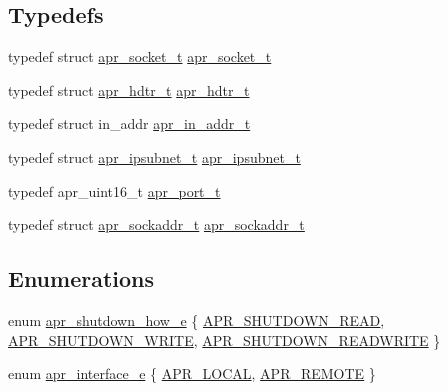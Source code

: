 \subsection*{Typedefs}
\begin{DoxyCompactItemize}
\item 
typedef struct \hyperlink{group__apr__network__io_ga49262b223e7434746e1f1737659aa2c3}{apr\+\_\+socket\+\_\+t} \hyperlink{group__apr__network__io_ga49262b223e7434746e1f1737659aa2c3}{apr\+\_\+socket\+\_\+t}
\item 
typedef struct \hyperlink{structapr__hdtr__t}{apr\+\_\+hdtr\+\_\+t} \hyperlink{group__apr__network__io_ga97887d5358a9c79c241ccafab61d8ff5}{apr\+\_\+hdtr\+\_\+t}
\item 
typedef struct in\+\_\+addr \hyperlink{group__apr__network__io_gad30d6c55a354a9a2e0a8747abb0c8176}{apr\+\_\+in\+\_\+addr\+\_\+t}
\item 
typedef struct \hyperlink{group__apr__network__io_gac86ee04eb80f938902095d1d0a67c324}{apr\+\_\+ipsubnet\+\_\+t} \hyperlink{group__apr__network__io_gac86ee04eb80f938902095d1d0a67c324}{apr\+\_\+ipsubnet\+\_\+t}
\item 
typedef apr\+\_\+uint16\+\_\+t \hyperlink{group__apr__network__io_gaa670a71960f6eb4fe0d0de2a1e7aba03}{apr\+\_\+port\+\_\+t}
\item 
typedef struct \hyperlink{structapr__sockaddr__t}{apr\+\_\+sockaddr\+\_\+t} \hyperlink{group__apr__network__io_ga373fb6f32d0875c5deb648b779c8a709}{apr\+\_\+sockaddr\+\_\+t}
\end{DoxyCompactItemize}
\subsection*{Enumerations}
\begin{DoxyCompactItemize}
\item 
enum \hyperlink{group__apr__network__io_gae2130f1fa2d0db58c5c3c9c73d9b4009}{apr\+\_\+shutdown\+\_\+how\+\_\+e} \{ \hyperlink{group__apr__network__io_ggae2130f1fa2d0db58c5c3c9c73d9b4009a88d0661d35eea5319715d6ca69265b01}{A\+P\+R\+\_\+\+S\+H\+U\+T\+D\+O\+W\+N\+\_\+\+R\+E\+AD}, 
\hyperlink{group__apr__network__io_ggae2130f1fa2d0db58c5c3c9c73d9b4009a5e335b392088e14df65d1bd5e0db7c46}{A\+P\+R\+\_\+\+S\+H\+U\+T\+D\+O\+W\+N\+\_\+\+W\+R\+I\+TE}, 
\hyperlink{group__apr__network__io_ggae2130f1fa2d0db58c5c3c9c73d9b4009add172f55ff5ee7b930683a3903c99768}{A\+P\+R\+\_\+\+S\+H\+U\+T\+D\+O\+W\+N\+\_\+\+R\+E\+A\+D\+W\+R\+I\+TE}
 \}
\item 
enum \hyperlink{group__apr__network__io_ga1982f44f48fdf00a8bd754bc7b773edc}{apr\+\_\+interface\+\_\+e} \{ \hyperlink{group__apr__network__io_gga1982f44f48fdf00a8bd754bc7b773edca6c23a4bf48b8f93dff08adf827382616}{A\+P\+R\+\_\+\+L\+O\+C\+AL}, 
\hyperlink{group__apr__network__io_gga1982f44f48fdf00a8bd754bc7b773edcaeb8be70b031f06a513ac0ebcaa5bac8a}{A\+P\+R\+\_\+\+R\+E\+M\+O\+TE}
 \}
\end{DoxyCompactItemize}

